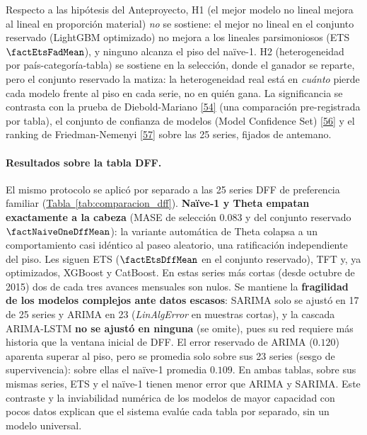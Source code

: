 \documentclass[12pt,letterpaper]{report}
\newcommand{\cita}[1]{\hyperref[bib:#1]{[#1]}}
\begin{document}
Respecto a las hipótesis del Anteproyecto, H1 (el mejor modelo no lineal mejora al lineal
en proporción material) \textit{no} se sostiene: el mejor no lineal en el conjunto reservado
(LightGBM optimizado) no mejora a los lineales parsimoniosos (ETS $\factEtsFadMean$), y ninguno
alcanza el piso del naïve-1. H2 (heterogeneidad por país-categoría-tabla) se sostiene en la
selección, donde el ganador se reparte, pero el conjunto reservado la matiza: la heterogeneidad
real está en \textit{cuánto} pierde cada modelo frente al piso en cada serie, no en quién gana.
La significancia se contrasta con la prueba de Diebold-Mariano \cita{54} (una comparación
pre-registrada por tabla), el conjunto de confianza de modelos (Model Confidence Set) \cita{56}
y el ranking de Friedman-Nemenyi \cita{57} sobre las 25 series, fijados de antemano.

\paragraph{Resultados sobre la tabla DFF.} El mismo protocolo se aplicó por separado a las 25
series DFF de preferencia familiar (\hyperref[tab:comparacion_dff]{Tabla~\ref*{tab:comparacion_dff}}). \textbf{Naïve-1 y Theta
empatan exactamente a la cabeza} (MASE de selección $0.083$ y del conjunto reservado
$\factNaiveOneDffMean$): la variante automática de Theta colapsa a un comportamiento casi
idéntico al paseo aleatorio, una ratificación independiente del piso. Les siguen ETS
($\factEtsDffMean$ en el conjunto reservado), TFT y, ya optimizados, XGBoost y CatBoost. En
estas series más cortas (desde octubre de 2015) dos de cada tres avances mensuales son nulos. Se
mantiene la \textbf{fragilidad de los modelos complejos ante datos escasos}: SARIMA solo se
ajustó en 17 de 25 series y ARIMA en 23 (\textit{LinAlgError} en muestras cortas), y la cascada
ARIMA-LSTM \textbf{no se ajustó en ninguna} (se omite), pues su red requiere más historia que la
ventana inicial de DFF. El error reservado de ARIMA ($0.120$) aparenta superar al piso, pero se
promedia solo sobre sus 23 series (sesgo de supervivencia): sobre ellas el naïve-1 promedia
$0.109$. En ambas tablas, sobre sus mismas series, ETS y el naïve-1 tienen menor error que ARIMA
y SARIMA. Este contraste y la inviabilidad numérica de los modelos de mayor capacidad con pocos
datos explican que el sistema evalúe cada tabla por separado, sin un modelo universal.
\end{document}
